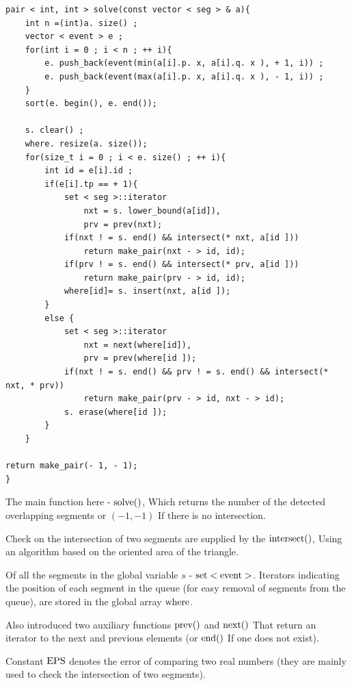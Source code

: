 \begin{verbatim}
pair < int, int > solve(const vector < seg > & a){
    int n =(int)a. size() ;
    vector < event > e ;
    for(int i = 0 ; i < n ; ++ i){
        e. push_back(event(min(a[i].p. x, a[i].q. x ), + 1, i)) ;
        e. push_back(event(max(a[i].p. x, a[i].q. x ), - 1, i)) ;
    }
    sort(e. begin(), e. end());
 
    s. clear() ;
    where. resize(a. size());
    for(size_t i = 0 ; i < e. size() ; ++ i){
        int id = e[i].id ;
        if(e[i].tp == + 1){
            set < seg >::iterator
                nxt = s. lower_bound(a[id]),
                prv = prev(nxt);
            if(nxt ! = s. end() && intersect(* nxt, a[id ]))
                return make_pair(nxt - > id, id);
            if(prv ! = s. end() && intersect(* prv, a[id ]))
                return make_pair(prv - > id, id);
            where[id]= s. insert(nxt, a[id ]);
        }
        else {
            set < seg >::iterator
                nxt = next(where[id]),
                prv = prev(where[id ]);
            if(nxt ! = s. end() && prv ! = s. end() && intersect(* nxt, * prv))
                return make_pair(prv - > id, nxt - > id);
            s. erase(where[id ]);
        }
    }
 
return make_pair(- 1, - 1);
} 
\end{verbatim}
The main function here - $\rm solve()$, Which returns the number of the detected overlapping segments or $(-1, -1)$ If there is no intersection.

Check on the intersection of two segments are supplied by the $\rm intersect()$, Using an algorithm based on the oriented area of the triangle.

Of all the segments in the global variable $s$ - $\rm set <event>$. Iterators indicating the position of each segment in the queue (for easy removal of segments from the queue), are stored in the global array $\rm where$.

Also introduced two auxiliary functions $\rm prev()$ and $\rm next()$ That return an iterator to the next and previous elements (or $\rm end()$ If one does not exist).

Constant $\rm EPS$ denotes the error of comparing two real numbers (they are mainly used to check the intersection of two segments).
